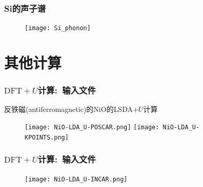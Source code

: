 \frame
{
	\frametitle{\textrm{Si}的声子谱}
\begin{figure}[h!]
	\vskip -12pt
\centering
\texttt{[image: Si\_phonon]}
\caption{\fontsize{6.2pt}{5.2pt}}%
\label{Fig:Si_phonon}
\end{figure}
{\fontsize{7.2pt}{5.2pt}\selectfont{有了声子谱的基本数据，就可以估计晶体的熵、自由能和热膨胀等热力学数据}}%
}

\section{其他计算}
\frame
{
	\frametitle{$\mathrm{DFT}+U$计算:~输入文件}
反铁磁(\textrm{antiferromagnetic})的\textrm{NiO}的\textrm{LSDA+$U$}计算%
\begin{figure}[h!]
\centering
\texttt{[image: NiO-LDA\_U-POSCAR.png]}
\texttt{[image: NiO-LDA\_U-KPOINTS.png]}
\caption{\fontsize{6.2pt}{5.2pt}}%
\label{NiO-LDA_U-Input}
\end{figure}
}

\frame
{
	\frametitle{$\mathrm{DFT}+U$计算:~输入文件}
\begin{figure}[h!]
	\vskip -7pt
\centering
\texttt{[image: NiO-LDA\_U-INCAR.png]}
\caption{\fontsize{6.2pt}{5.2pt}}%
\label{NiO-LDA_U-INCAR}
\end{figure}
}

